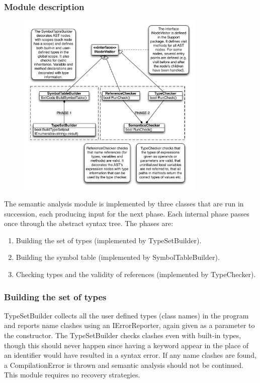 \documentclass[a4paper,11pt]{article}
\begin{document}
\subsubsection{Module description}

\begin{figure}[h!]
\centering
\includegraphics[width=0.8\textwidth]{semantic_analysis.pdf}
\end{figure}

The semantic analysis module is implemented by three classes that are run in succession, each producing input for the next phase. Each internal phase passes once through the abstract syntax tree. The phases are:

\begin{enumerate}
\item Building the set of types (implemented by TypeSetBuilder).
\item Building the symbol table (implemented by SymbolTableBuilder).
\item Checking types and the validity of references (implemented by TypeChecker).
\end{enumerate}

\subsubsection{Building the set of types}

TypeSetBuilder collects all the user defined types (class names) in the program and reports name clashes using an IErrorReporter, again given as a parameter to the constructor. The TypeSetBuilder checks clashes even with built-in types, though this should never happen since having a keyword appear in the place of an identifier would have resulted in a syntax error. If any name clashes are found, a CompilationError is thrown and semantic analysis should not be continued. This module requires no recovery strategies.
\end{document}
